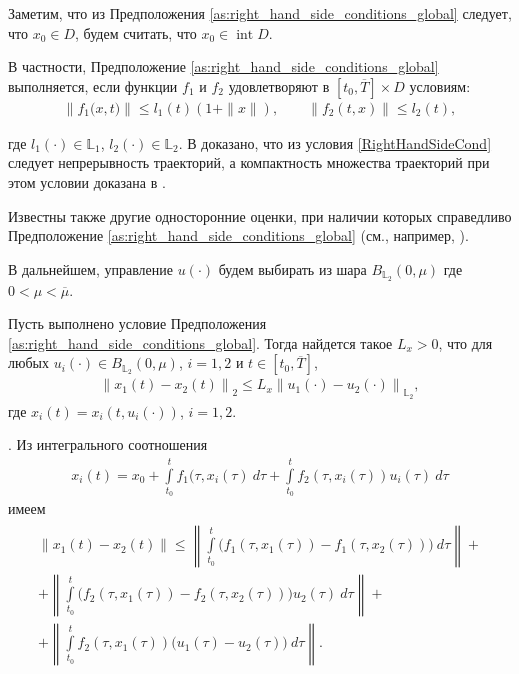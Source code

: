 \documentclass[../main.tex]{subfiles}
\begin{document}
	Заметим, что из Предположения  \ref{as:right_hand_side_conditions_global} следует, что $x_0 \in D$, будем считать, что $x_0 \in \operatorname{int} D$.

	В частности, Предположение \ref{as:right_hand_side_conditions_global} выполняется, если  функции $f_1$ и $f_2$ удовлетворяют в $ [t_0, \overline{T}] \times D$ условиям:
	\begin{gather}\label{RightHandSideCond}
		\left\|f_1\big(x,t\big) \right\| \leqslant l_1(t) (1 + \|x\|), \qquad  \left\| f_2(t,x) \right\| \leqslant l_2(t), 
	\end{gather}
	
	где $ l_1(\cdot) \in  \mathbb{L}_1$, $ l_2(\cdot) \in  \mathbb{L}_2$. В \cite[Теорема 5]{Fillipov2} доказано, что из условия \eqref{RightHandSideCond} следует непрерывность траекторий, а компактность множества траекторий при этом условии доказана в \cite[Утверждение 2]{GusZyk}.
	
	Известны также другие односторонние оценки, при наличии которых справедливо Предположение  \ref{as:right_hand_side_conditions_global} (см., например, \cite{Fillipov2, Guseinov}).
	
	В дальнейшем, управление $ u(\cdot) $ будем выбирать из шара $ B_{\mathbb{L}_2}(0,\mu) $ где $ 0 < \mu < \overline{\mu} $.
	
	\begin{lemma}\label{lem:Lip_of_solutions_global}
			Пусть выполнено условие Предположения \ref{as:right_hand_side_conditions_global}. Тогда найдется такое $L_x > 0$, что для любых $u_i(\cdot) \in B_{\mathbb{L}_2}(0,\mu) $, $i = 1,2$ и $t \in [t_0, \overline{T}]$, 
			\begin{gather}
			\left\| x_1(t) - x_2(t) \right\|_2 \leqslant L_x \left\|u_1(\cdot) - u_2(\cdot) \right\|_{\mathbb{L}_2}, 
			\end{gather}
		где $x_i(t) = x_i(t,u_i(\cdot))$, $i = 1,2$. 
	\end{lemma}
	\doc. 
	Из интегрального соотношения
	\begin{gather*}
		 x_i(t) = x_0 + \int\limits_{t_0}^{t} f_1(\tau, x_i(\tau)\ d\tau + \int\limits_{t_0}^{t} f_2(\tau,x_i(\tau))u_i(\tau)\ d\tau 
	\end{gather*}
	имеем 
	\begin{gather}\label{diff_of_solution}
		\begin{gathered}
		\| x_1(t) - x_2(t) \| \leqslant 
		\left\|  \int\limits_{t_0}^{t} \Big( f_1(\tau, x_1(\tau)) - f_1(\tau, x_2(\tau)) \Big) \ d\tau \right\| +  \\ + 
		\left\|  \int\limits_{t_0}^{t} \Big( f_2(\tau, x_1(\tau)) - f_2(\tau,x_2(\tau)) \Big) u_2(\tau) \ d\tau \right\| + \\ +
		\left\|  \int\limits_{t_0}^{t} f_2(\tau,x_1(\tau)) \big( u_1(\tau) - u_2(\tau) \big) \ d\tau \right\|. 
		\end{gathered}
	\end{gather}
	
\end{document}

